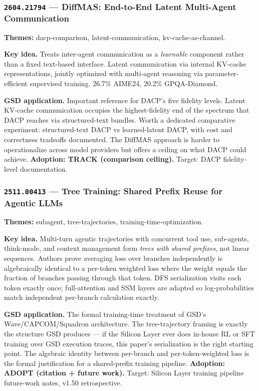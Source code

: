 \documentclass[11pt,letterpaper]{article}
\newcommand{\arxivid}[1]{\texttt{\textcolor{accent}{#1}}}
\newcommand{\paperhead}[2]{\noindent\textbf{\sffamily\textcolor{secondary}{#1}} \textemdash{} #2}
\begin{document}
\subsubsection{\arxivid{2604.21794} --- DiffMAS: End-to-End Latent Multi-Agent Communication}

\paperhead{Themes:}{dacp-comparison, latent-communication, kv-cache-as-channel.}

\textbf{Key idea.} Treats inter-agent communication as a \textit{learnable} component rather than a fixed text-based interface. Latent communication via internal KV-cache representations, jointly optimized with multi-agent reasoning via parameter-efficient supervised training. 26.7\% AIME24, 20.2\% GPQA-Diamond.

\textbf{GSD application.} Important reference for DACP's five fidelity levels. Latent KV-cache communication occupies the highest-fidelity end of the spectrum that DACP reaches via structured-text bundles. Worth a dedicated comparative experiment: structured-text DACP vs learned-latent DACP, with cost and correctness tradeoffs documented. The DiffMAS approach is harder to operationalize across model providers but offers a ceiling on what DACP could achieve. \textbf{Adoption: TRACK (comparison ceiling).} Target: DACP fidelity-level documentation.

\subsubsection{\arxivid{2511.00413} --- Tree Training: Shared Prefix Reuse for Agentic LLMs}

\paperhead{Themes:}{subagent, tree-trajectories, training-time-optimization.}

\textbf{Key idea.} Multi-turn agentic trajectories with concurrent tool use, sub-agents, think-mode, and context management form \textit{trees with shared prefixes}, not linear sequences. Authors prove averaging loss over branches independently is algebraically identical to a per-token weighted loss where the weight equals the fraction of branches passing through that token. DFS serialization visits each token exactly once; full-attention and SSM layers are adapted so log-probabilities match independent per-branch calculation exactly.

\textbf{GSD application.} The formal training-time treatment of GSD's Wave/CAPCOM/Squadron architecture. The tree-trajectory framing is exactly the structure GSD produces --- if the Silicon Layer ever does in-house RL or SFT training over GSD execution traces, this paper's serialization is the right starting point. The algebraic identity between per-branch and per-token-weighted loss is the formal justification for a shared-prefix training pipeline. \textbf{Adoption: ADOPT (citation + future work).} Target: Silicon Layer training pipeline future-work notes, v1.50 retrospective.
\end{document}

